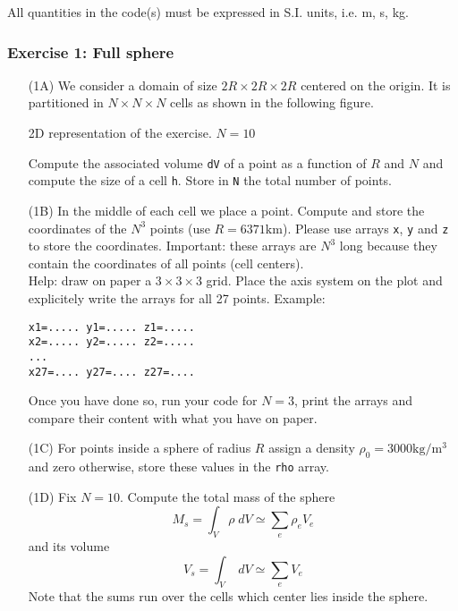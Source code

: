 {\color{red} All quantities in the code(s) must be expressed in S.I. units, i.e. \si{\metre}, \si{\second}, \si{\kilo\gram}. }


\subsubsection*{Exercise 1: Full sphere}

\begin{itemize}
\item[(1A)] We consider a domain of size $2R\times 2R \times 2R$ centered on the origin. It is 
partitioned in $N\times N \times N$ cells as shown in the following figure.

\begin{center}

{\captionfont 2D representation of the exercise. $N=10$}
\end{center}


Compute the associated volume {\tt dV} of a point as a function of $R$ and $N$ and  
compute the size of a cell {\tt h}. Store in {\tt N} the total number of points.


\item[(1B)] 
In the middle of each cell we place a point. Compute and store the coordinates 
of the $N^3$ points (use $R=6371\si{\kilo\metre}$). Please use 
arrays {\tt x}, {\tt y} and {\tt z} to store the coordinates.
Important: these arrays are $N^3$ long because they contain the coordinates of all points (cell centers).\\
Help: draw on paper a $3\times3\times3$ grid. Place the axis system on the plot and explicitely write the arrays 
for all 27 points. Example:
\begin{verbatim}
x1=..... y1=..... z1=.....
x2=..... y2=..... z2=.....
...
x27=.... y27=.... z27=....
\end{verbatim}
Once you have done so, run your code for $N=3$, print the arrays and compare their content with what you 
have on paper.


\item[(1C)] For points inside a sphere of radius $R$ assign a 
density $\rho_0=3000\si{\kilo\gram\per\cubic\metre}$ 
and zero otherwise, store these values in the {\tt rho} array.

\item[(1D)] Fix $N=10$. Compute the total mass of the sphere
\[
M_s = \int_V \rho \; dV \simeq \sum_{e} \rho_e V_e
\] 
and its volume 
\[
V_s = \int_V \; dV \simeq \sum_{e}  V_e
\] 
Note that the sums run over the cells which center lies inside the sphere.


\end{itemize}
